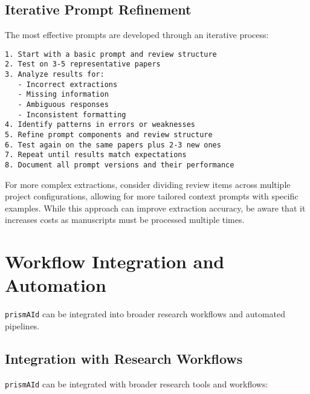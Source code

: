 \subsection{Iterative Prompt Refinement}

The most effective prompts are developed through an iterative process:

\begin{infobox}
\begin{lstlisting}
1. Start with a basic prompt and review structure
2. Test on 3-5 representative papers
3. Analyze results for:
   - Incorrect extractions
   - Missing information
   - Ambiguous responses
   - Inconsistent formatting
4. Identify patterns in errors or weaknesses
5. Refine prompt components and review structure
6. Test again on the same papers plus 2-3 new ones
7. Repeat until results match expectations
8. Document all prompt versions and their performance
\end{lstlisting}
\end{infobox}

For more complex extractions, consider dividing review items across multiple project configurations, allowing for more tailored context prompts with specific examples. While this approach can improve extraction accuracy, be aware that it increases costs as manuscripts must be processed multiple times.

\section{Workflow Integration and Automation}

\texttt{prismAId} can be integrated into broader research workflows and automated pipelines.

\subsection{Integration with Research Workflows}

\texttt{prismAId} can be integrated with broader research tools and workflows:

